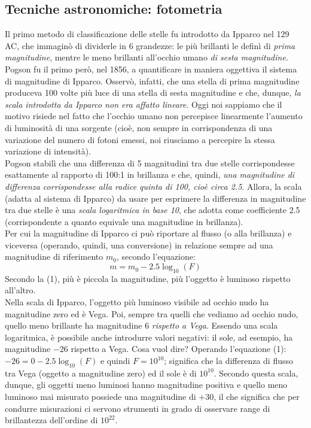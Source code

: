 \documentclass[a4paper,11pt]{article}
\begin{document}
\subsection{Tecniche astronomiche: fotometria}

Il primo metodo di classificazione delle stelle fu introdotto da Ipparco nel 129 AC, che immaginò di dividerle in 6 grandezze: le più brillanti le definì di \textit{prima magnitudine}, mentre le meno brillanti all'occhio umano \textit{di sesta magnitudine.}\\
Pogson fu il primo però, nel 1856, a quantificare in maniera oggettiva il sistema di magnitudine di Ipparco. Osservò, infatti, che una stella di prima magnitudine produceva 100 volte più luce di una stella di sesta magnitudine e che, dunque, \textit{la scala introdotta da Ipparco non era affatto lineare}. Oggi noi sappiamo che il motivo risiede nel fatto che l'occhio umano non percepisce linearmente l'aumento di luminosità di una sorgente (cioè, non sempre in corrispondenza di una variazione del numero di fotoni emessi, noi riusciamo a percepire la stessa variazione di intensità).\\
Pogson stabilì che una differenza di 5 magnitudini tra due stelle corrispondesse esattamente al rapporto di 100:1 in brillanza e che, quindi, \textit{una magnitudine di differenza corrispondesse alla radice quinta di 100, cioè circa 2.5}.
Allora, la scala (adatta al sistema di Ipparco) da usare per esprimere la differenza in magnitudine tra due stelle è una \textit{scala logaritmica in base 10}, che adotta come coefficiente 2.5 (corrispondente a quanto equivale una magnitudine in brillanza).\\ 
Per cui la magnitudine di Ipparco ci può riportare al flusso (o alla brillanza) e viceversa (operando, quindi, una conversione) in relazione sempre ad una magnitudine di riferimento \(m_0\), secondo l'equazione: 
\begin{equation}
   m = m_0 - 2.5\log_{10}(F)
\end{equation}
Secondo la (1), più è piccola la magnitudine, più l'oggetto è luminoso rispetto all'altro.\\ 
Nella scala di Ipparco, l'oggetto più luminoso visibile ad occhio nudo ha magnitudine zero ed è Vega. Poi, sempre tra quelli che vediamo ad occhio nudo, quello meno brillante ha magnitudine 6 \textit{rispetto a Vega}. Essendo una scala logaritmica, è possibile anche introdurre valori negativi: il sole, ad esempio, ha magnitudine \(-26\) rispetto a Vega. Cosa vuol dire? Operando l'equazione (1): \(-26 = 0 -2.5\log_{10}(F)\) e quindi \(F = 10^{10}\); significa che la differenza di flusso tra Vega (oggetto a magnitudine zero) ed il sole è di \(10^{10}\). Secondo questa scala, dunque, gli oggetti meno luminosi hanno magnitudine positiva e quello meno luminoso mai misurato possiede una magnitudine di \(+30\), il che significa che per condurre misurazioni ci servono strumenti in grado di osservare range di brillantezza dell'ordine di \(10^{22}\).\\
\end{document}
